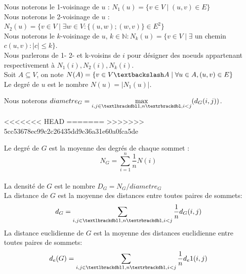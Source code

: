 \begin{mydef}
Nous noterons le 1-voisinage de $u$ : $N_1(u) = \{ v \in V  \mid (u,v) \in E \}$ \\
Nous noterons le 2-voisinage de $u$ : $N_2(u) = \{ v \in V \mid  \exists w \in V :\{(u,w);(w,v)\} \in E ^2\}$ \\
Nous noterons le $k$-voisinage de $u$, $k \in \mathbb{N} : N_k(u) = \{ v \in V  \mid \exists $ un chemin $c (u,v): |c| \leq k\}$.\\
Nous parlerons de 1- 2- et k-voisins de $i$ pour désigner des noeuds appartenant respectivement
 à $N_1(i), N_2(i),N_k(i)$. \\
Soit $A \subseteq V$, on note $N(A) = \{ v \in V\textbackslash  A \mid \forall u\in A,(u,v) \in E \}$ \\
Le degré de $ u $ est le nombre  $N(u)=|N_1(u)|$.\\
\end{mydef}

\begin{mydef}
Nous noterons $diametre_G= \max\limits_{i,j\in \textlbrackdbl 1,n \textrbrackdbl,i<j} (d_G(i,j))$.
\end{mydef}
 

<<<<<<< HEAD
=======
>>>>>>> 5cc53678ec99c2c26435dd9c36a31e60a0fca5de








\begin{mydef}
 
 Le degré de $G$ est la moyenne des degrés de chaque sommet : $$N_G=\sum_{i=1}^n{\frac1n N(i)}$$\\
 La densité de $G$ est le nombre $D_G=N_G/diametre_G$\\
 La distance de $G$ est la moyenne des distances entre toutes paires de sommets:$$d_G=\sum_{i,j\in \textlbrackdbl 1,n \textrbrackdbl,i<j}{\frac1n d_G(i,j)}$$
 La distance euclidienne de $G$ est la moyenne des distances euclidienne entre toutes paires de sommets:$$d_e(G)=\sum_{i,j\in \textlbrackdbl 1,n \textrbrackdbl,i<j}{\frac1n d_e1(i,j)}$$

\end{mydef}

